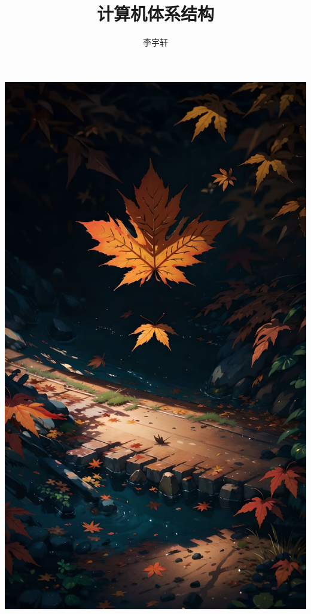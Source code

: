 \documentclass{notebook-neon}
\title{计算机体系结构}
\author{李宇轩}
\begin{document}
\maketitle

\frontmatter

\makesymb

\begin{center}
    \includegraphics[width=13.5cm]{019.jpeg}
\end{center}

\clearpage

\tableofcontents
\listoffigures
\listoftables
\lstlistoflistings

\mainmatter

\nocite{*}




\appendix

\backmatter


\end{document}
